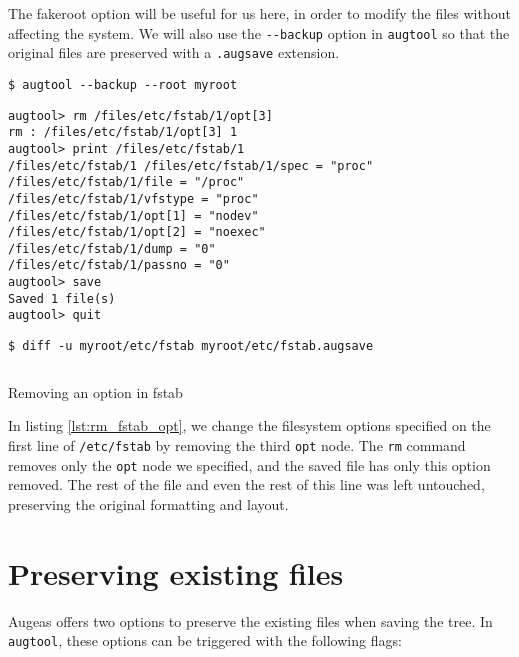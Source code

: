 The fakeroot option will be useful for us here, in order to modify the files without affecting the system. We will also use the \verb!--backup! option in \verb!augtool! so that the original files are preserved with a \verb!.augsave! extension.

     

\begin{listing}
  \begin{verbatim}
$ augtool --backup --root myroot
  \end{verbatim}
  \begin{verbatim}
augtool> rm /files/etc/fstab/1/opt[3]
rm : /files/etc/fstab/1/opt[3] 1
augtool> print /files/etc/fstab/1
/files/etc/fstab/1 /files/etc/fstab/1/spec = "proc"
/files/etc/fstab/1/file = "/proc"
/files/etc/fstab/1/vfstype = "proc"
/files/etc/fstab/1/opt[1] = "nodev"
/files/etc/fstab/1/opt[2] = "noexec"
/files/etc/fstab/1/dump = "0"
/files/etc/fstab/1/passno = "0"
augtool> save
Saved 1 file(s)
augtool> quit
  \end{verbatim}
  \begin{verbatim}
$ diff -u myroot/etc/fstab myroot/etc/fstab.augsave
  \end{verbatim}
  \inputminted{diff}{listings/fstab_opt.diff}
  \caption{Removing an option in fstab}
  \label{lst:rm_fstab_opt}
\end{listing}


In listing \ref{lst:rm_fstab_opt}, we change the filesystem options specified on the first line of \nolinkurl{/etc/fstab} by removing the third \verb!opt! node. The \verb!rm! command removes only the \verb!opt! node we specified, and the saved file has only this option removed. The rest of the file and even the rest of this line was left untouched, preserving the original formatting and layout.

\section{Preserving existing files}

  

Augeas offers two options to preserve the existing files when saving the tree. In \verb!augtool!, these options can be triggered with the following flags:

